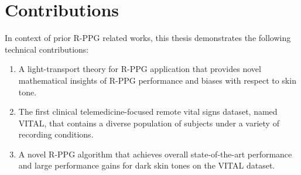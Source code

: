 \section{Contributions}

In context of prior R-PPG related works, this thesis demonstrates the following technical contributions:

\begin{enumerate}
    \item A light-transport theory for R-PPG application that provides novel mathematical insights of R-PPG performance and biases with respect to skin tone.
    \item The first clinical telemedicine-focused remote vital signs dataset, named VITAL, that contains a diverse population of subjects under a variety of recording conditions. 
    \item A novel R-PPG algorithm that achieves overall state-of-the-art performance and large performance gains for dark skin tones on the VITAL dataset.
\end{enumerate}



